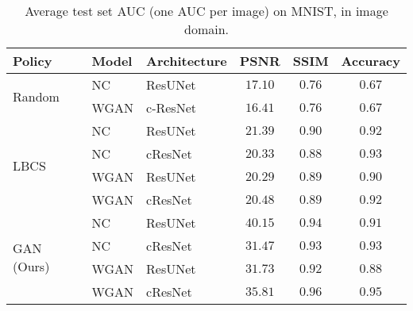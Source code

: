 \begin{table}[!ht]
\centering
    \begin{tabular}{lll|ccc}
\toprule
Policy & Model & Architecture & PSNR  &SSIM& Accuracy\\
\midrule
\multirow{2}{*}{Random} 
& NC & ResUNet& $17.10$  & $0.76$ & $0.67$ \\
& WGAN & c-ResNet & $16.41$  & $0.76$ & $0.67$ \\    
\midrule
\multirow{4}{*}{LBCS}
& NC &  ResUNet&$21.39$  & $0.90$ & $0.92$ \\
& NC &  cResNet&$20.33$  & $0.88$ & $0.93$ \\
& WGAN & ResUNet& $20.29$  & $0.89$ & $0.90$ \\
& WGAN & cResNet& $20.48$  & $0.89$ & $0.92$\\
 
\midrule
\multirow{4}{*}{\begin{minipage}{1cm}GAN (Ours)\end{minipage}}
 & NC & ResUNet& $\mathbf{40.15}$  & $\mathbf{0.94}$ & $0.91$ \\
 & NC & cResNet& $31.47$  & $0.93$ & $\mathbf{0.93}$ \\       
 & WGAN & ResUNet& $31.73$  & $0.92$ & $0.88$ \\
 & WGAN & cResNet& $\mathbf{35.81}$  & $\mathbf{0.96}$ & $\mathbf{0.95}$ \\    
 
 
\bottomrule
\end{tabular}
\caption{Average test set AUC (one AUC per image) on MNIST, in image domain.}\label{tab:comp_mnist_im}    
\end{table}


